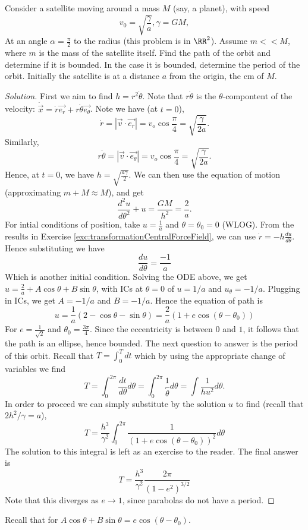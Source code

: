 \begin{example}
  Consider a satellite moving around a mass $M$ (say, a planet), with speed
  \[v_0 =\sqrt{\frac{\gamma}{a}}, \gamma=GM,\]
  At an angle $\alpha=\frac{\pi}{2}$ to the radius (this problem is in $\RR^2$).
  Assume $m<<M$, where $m$ is the mass of the satellite itself. Find the path of
  the orbit and determine if it is bounded. In the case it is bounded, determine
  the period of the orbit.  Initially the satellite is at a distance $a$ from
  the origin, the cm of $M$.
\end{example}
\begin{proof}[Solution]
  First we aim to find $h=r^2\dot{\theta}$. Note that $r\dot{\theta}$ is the
  $\theta$-compontent of the velocity:
  $\dot{\vec{x}}=\dot{r}\vec{e_r}+r\dot{\theta}\vec{e_{\theta}}$. Note we have
  (at $t=0$),
  \[\dot{r}= |\vec{v}\cdot\vec{e_r}|= v_o\cos\frac{\pi}{4}=
  \sqrt{\frac{\gamma}{2a}}.\]
  Similarly, 
  \[r\dot{\theta} = |\vec{v}\cdot\vec{e_{\theta}}| = v_o
  \cos\frac{\pi}{4} = \sqrt{\frac{\gamma}{2a}}.\]
  Hence, at $t=0$, we have $h=\sqrt{\frac{a\gamma}{2}}$. We can then use the
  equation of motion (approximating $m+M\approx M$), and get 
  \[\frac{d^2u}{d\theta^2} + u = \frac{GM}{h^2} = \frac{2}{a}.\]
  For intial conditions of position, take $u=\frac{1}{a}$ and
  $\theta=\theta_0=0$ (WLOG). From the results in Exercise
  \ref{exc:transformationCentralForceField}, we can use
  $\dot{r}=-h\frac{du}{d\theta}$. Hence substituting we have 
  \[\frac{du}{d\theta} = \frac{-1}{a}\]
  Which is another initial condition. Solving the ODE above, we get
  $u=\frac{2}{a} + A\cos\theta + B\sin\theta$, with ICs at $\theta=0$ of $u=1/a$
  and $u_{\theta}=-1/a$. Plugging in ICs, we get $A=-1/a$ and $B=-1/a$. Hence
  the equation of path is 
  \[u=\frac{1}{a}\left( 2-\cos\theta - \sin\theta \right)=\frac{2}{a}\left(
  1+e\cos\left( \theta-\theta_0 \right) \right)\]
  For $e=\frac{1}{\sqrt{2}}$ and $\theta_0=\frac{3\pi}{4}$. Since the
  eccentricity is between $0$ and $1$, it follows that the path is an ellipse,
  hence bounded. The next question to answer is the period of this orbit. Recall
  that $T=\int_0^T dt$ which by using the appropriate change of variables we
  find
  \[T=\int_{0}^{2\pi}\frac{dt}{d\theta}d\theta =
  \int_0^{2\pi}\frac{1}{\dot{\theta}} d\theta = \int \frac{1}{hu^2}d\theta.\]
  In order to proceed we can simply substitute by the solution $u$ to find
  (recall that $2h^2/\gamma = a$),
  \[T= \frac{h^3}{\gamma^2} \int_0^{2\pi}
  \frac{1}{(1+e\cos(\theta-\theta_0))^2}d\theta\]
  The solution to this integral is left as an exercise to the reader. The final
  answer is 
  \[T= \frac{h^3}{\gamma^2} \frac{2\pi}{(1-e^2)^{3/2}}\]
  Note that this diverges as $e\to 1$, since parabolas do not have a period.
\end{proof}
\begin{remark}
  Recall that for $A\cos\theta+B\sin\theta=e\cos(\theta-\theta_0)$.
\end{remark}


